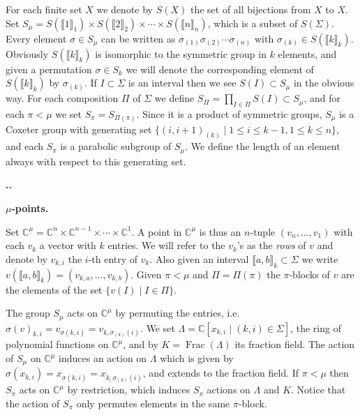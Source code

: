 \documentclass[11pt,fleqn]{amsart}
\renewcommand\thesection{\arabic{section}}
\newcounter{para}[section]
\renewcommand\thepara{\thesection.\arabic{para}}
\def\paragraph{%
 \noindent
 \refstepcounter{para}%
 \textbf{\thepara.}\hspace{1ex}%
}
\newcommand\about[1]{%
 {\bfseries#1.}%
}
\newcommand\CC{\mathbb C}
\newcommand\interval[1]{\llbracket #1 \rrbracket}
\DeclareMathOperator\Frac{Frac}
\begin{document}
For each finite set $X$ we denote by $S(X)$ the set of all bijections from
$X$ to $X$. Set $S_\mu = S(\interval{1}_1) \times S(\interval{2}_2) \times
\cdots \times S(\interval{n}_n)$, which is a subset of $S(\Sigma)$. 
Every element $\sigma \in S_\mu$ can be written as $\sigma_{(1)} \sigma_{(2)}
\cdots \sigma_{(n)}$ with $\sigma_{(k)} \in S(\interval{k}_k)$. Obviously
$S(\interval{k}_k)$ is isomorphic to the symmetric group in $k$ elements,
and given a permutation $\sigma \in S_k$ we will denote the corresponding
element of $S(\interval{k}_k)$ by $\sigma_{(k)}$. If $I 
\subset \Sigma$ is an interval then we see $S(I) \subset S_\mu$ in the obvious 
way. For each composition $\Pi$ of $\Sigma$ we define $S_\Pi = \prod_{I \in \Pi} 
S(I) \subset S_\mu$, and for each $\pi < \mu$ we set $S_\pi = S_{\Pi(\pi)}$.
Since it is a product of symmetric groups, $S_\mu$ is a Coxeter group
with generating set $\{(i,i+1)_{(k)} \mid 1 \leq i \leq k-1, 1 \leq k \leq 
n\}$, and each $S_\pi$ is a parabolic subgroup of $S_\mu$. We define the 
length of an element always with respect to this generating set.

\paragraph
\about{$\mu$-points}
\label{mu-points}
Set $\CC^\mu = \CC^{n} \times \CC^{n-1} \times \cdots \times \CC^{1}$. A point 
in $\CC^\mu$ is thus an $n$-tuple $(v_n, \ldots, v_1)$ with each $v_k$ a 
vector with $k$ entries. We will refer to the $v_k$'s as the \emph{rows} of 
$v$ and denote by $v_{k,i}$ the $i$-th entry of $v_k$. Also given an interval
$\interval{a,b}_k \subset \Sigma$ we write $v(\interval{a,b}_k) = (v_{k,a},
\ldots, v_{k,b})$. Given $\pi < \mu$ and $\Pi = \Pi(\pi)$ the $\pi$-blocks
of $v$ are the elements of the set $\{v(I) \mid I \in \Pi\}$.

The group $S_\mu$ acts on $\CC^\mu$ by permuting the entries, i.e. 
$\sigma(v)_{k,i} = v_{\sigma(k,i)} = v_{k,\sigma_{(k)}(i)}$. We set 
$\Lambda = \CC[x_{k,i} \mid (k,i) \in \Sigma]$, the ring of polynomial 
functions on $\CC^\mu$, and by $K = \Frac(\Lambda)$ its fraction field. The 
action of $S_\mu$ on $\CC^\mu$ induces an action on $\Lambda$ which is given 
by $\sigma(x_{k,i}) = x_{\sigma(k,i)} = x_{k,\sigma_{(k)}(i)}$, and extends to 
the fraction field. If $\pi < \mu$ then $S_\pi$ acts on $\CC^\mu$ by 
restriction, which induces $S_\pi$ actions on $\Lambda$ and $K$. Notice that
the action of $S_\pi$ only permutes elements in the same $\pi$-block.
\end{document}
